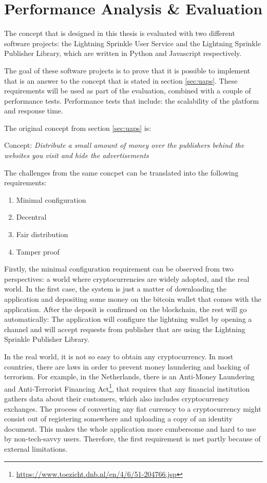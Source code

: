 \chapter{Performance Analysis \& Evaluation}
\label{cha:evaluation}

The concept that is designed in this thesis is evaluated with two different software projects: the Lightning Sprinkle User Service and the Lightning Sprinkle Publisher Library, which are written in Python and Javascript respectively. 

The goal of these software projects is to prove that it is possible to implement that is an answer to the concept that is stated in section \ref{sec:uaps}. These requirements will be used as part of the evaluation, combined with a couple of performance tests. Performance tests that include: the scalability of the platform and response time. 

\noindent The original concept from section \ref{sec:uaps} is:

\vspace{1em}

Concept: \textit{Distribute a small amount of money over the publishers behind the websites you visit and hide the advertisements}

\vspace{1em}

\noindent The challenges from the same concpet can be translated into the following requirements:
\begin{enumerate}
  \item Minimal configuration
  \item Decentral
  \item Fair distribution
  \item Tamper proof
\end{enumerate}

Firstly, the minimal configuration requirement can be observed from two perspectives: a world where cryptocurrencies are widely adopted, and the real world. In the first case, the system is just a matter of downloading the application and depositing some money on the bitcoin wallet that comes with the application. After the deposit is confirmed on the blockchain, the rest will go automatically: The application will configure the lightning wallet by opening a channel and will accept requests from publisher that are using the Lightning Sprinkle Publisher Library. 

In the real world, it is not so easy to obtain any cryptocurrency. In most countries, there are laws in order to prevent money laundering and backing of terrorism. For example, in the Netherlands, there is an Anti-Money Laundering and Anti-Terrorist Financing Act\footnote{\url{https://www.toezicht.dnb.nl/en/4/6/51-204766.jsp}}, that requires that any financial institution gathers data about their customers, which also includes cryptocurrency exchanges. The process of converting any fiat currency to a cryptocurrency might consist out of registering somewhere and uploading a copy of an identity document. This makes the whole application more cumbersome and hard to use by non-tech-savvy users. Therefore, the first requirement is met partly because of external limitations.

